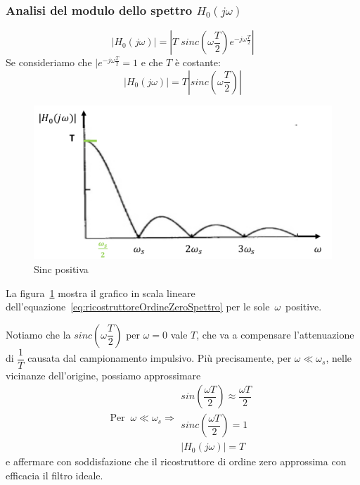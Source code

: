 \documentclass[a4paper]{report}
\begin{document}
\subsubsection{Analisi del modulo dello spettro $H_0(j \omega)$}
\[
|H_0(j \omega)| = \left| T\;sinc \left(\omega \dfrac{T}{2} \right)
e^{-j \omega \frac{T}{2}} \right|
\]
Se consideriamo che $|e^{-j \omega \frac{T}{2}} = 1$ e che $T$ \`e
costante:
\begin{equation}\label{eq:ricostruttoreOrdineZeroSpettro}
  |H_0(j \omega)| = T \left|sinc \left(\omega \dfrac{T}{2} \right)
  \right| 
\end{equation}
\begin{figure}[!h]
  \begin{center}
    \includegraphics[scale=0.5]{./figures/sincPositiva.png}
    \caption{Sinc positiva}\label{fig:sincPositiva}
  \end{center}
\end{figure}
La figura~\ref{fig:sincPositiva} mostra il grafico in scala lineare
dell'equazione~\ref{eq:ricostruttoreOrdineZeroSpettro} per le
sole~$\omega$~positive. 

Notiamo che la $sinc \left(\omega \dfrac{T}{2} \right)$ per $\omega =
0$ vale $T$, che va a compensare l'attenuazione di $\dfrac{1}{T}$
causata dal campionamento impulsivo. Pi\`u precisamente, per $\omega
\ll \omega_s$, nelle vicinanze dell'origine, possiamo approssimare
\begin{equation}
  \textrm{Per}\;\;\omega \ll \omega_s \Rightarrow
  \begin{array}{l}
    sin \left( \dfrac{\omega T}{2}\right) \approx \dfrac{\omega T}{2}\\
    sinc \left( \dfrac{\omega T}{2}\right) = 1\\
    |H_0(j \omega)| = T
  \end{array}
\end{equation}
e affermare con soddisfazione che il ricostruttore di ordine zero
approssima con efficacia il filtro ideale.
\end{document}

